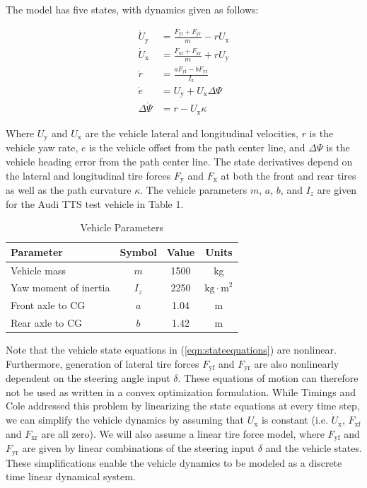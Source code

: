 \documentclass[10pt,a4paper]{article}
\begin{document}
The model has five states, with dynamics given as follows:

\begin{subequations}
\label{eqn:stateequations}
\begin{align}
        \dot{U}_\mathrm{y} & = \frac{F_\mathrm{yf} + F_\mathrm{yr}}{m}-rU_\mathrm{x} \\
        \dot{U}_\mathrm{x} & = \frac{F_\mathrm{xf} + F_\mathrm{xr}}{m}+rU_\mathrm{y} \\
				\dot{r}	   & = \frac{aF_\mathrm{yf} - bF_\mathrm{yr}}{I_\mathrm{z}}  \\
				\dot{e}    & = U_\mathrm{y} + U_\mathrm{x}\Delta\Psi \\
		\Delta\dot{\Psi}   & = r - U_\mathrm{x}\kappa
\end{align}
\end{subequations}

Where $U_\mathrm{y}$ and $U_\mathrm{x}$ are the vehicle lateral and longitudinal velocities, $r$ is the
vehicle yaw rate, $e$ is the vehicle offset from the path center line, and $\Delta\Psi$ is the vehicle heading error
from the path center line. The state derivatives depend on the lateral and longitudinal tire forces $F_\mathrm{y}$ and $F_\mathrm{x}$
at both the front and rear tires as well as the path curvature $\kappa$. The vehicle parameters $m$, $a$, $b$, and $I_z$ are given for
the Audi TTS test vehicle in Table 1. 

\begin{table}[h]
\small
\begin{center}
\caption{Vehicle Parameters}\label{tb:params}
\begin{tabular}{lccc}
Parameter & Symbol & Value & Units \\\hline
Vehicle mass & $m$ & 1500 & kg \\
Yaw moment of inertia & $I_z$ & 2250 & $\mathrm{kg \cdot m}^2$\\
Front axle to CG & $a$ & 1.04 & m\\
Rear axle to CG & $b$ & 1.42 & m \\\hline
\end{tabular}
\end{center}
\end{table}

Note that the vehicle state equations in (\ref{eqn:stateequations}) are nonlinear. Furthermore, generation of lateral tire
forces $F_\mathrm{yf}$ and $F_\mathrm{yr}$ are also nonlinearly dependent on the steering angle input $\delta$. These equations
of motion can therefore not be used as written in a convex optimization formulation. While Timings and Cole addressed this problem by linearizing
the state equations at every time step, we can simplify the vehicle dynamics by assuming that $U_\mathrm{x}$ is constant (i.e. $\dot{U}_\mathrm{x}$, $F_\mathrm{xf}$ and $F_\mathrm{xr}$ are all zero).
We will also assume a linear tire force model, where $F_\mathrm{yf}$ and $F_\mathrm{yr}$ are given by linear combinations of the steering input $\delta$ and the vehicle states.
These simplifications enable the vehicle dynamics to be modeled as a discrete time linear dynamical system.
 
\end{document}
